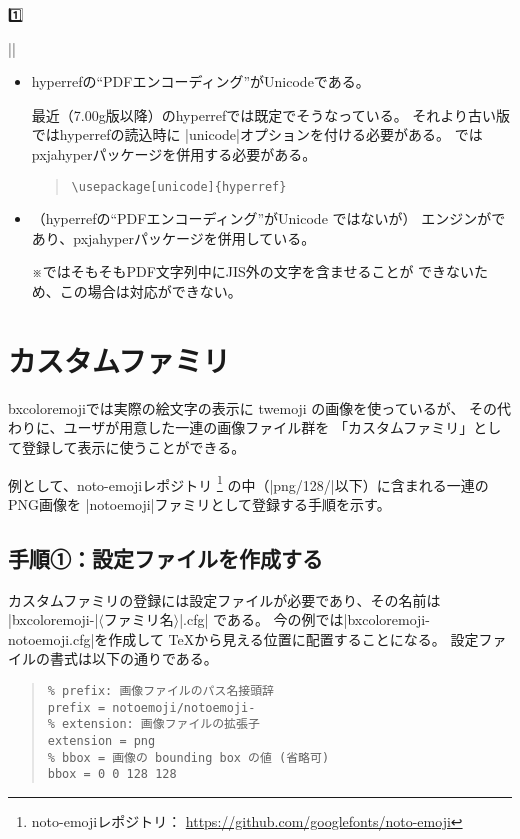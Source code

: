 \documentclass[a4paper]{ltjsarticle}
\renewcommand{\headfont}{\romanseries{sbc}\sffamily}
\newcommand{\CE}[1]{\coloremoji{#1}}
\newcommand{\Pkg}[1]{\textsf{#1}}
\newcommand{\Meta}[1]{$\langle$\mbox{}#1\mbox{}$\rangle$}
\newcommand{\Note}{\par\noindent ※}
\newcommand{\Means}{：\quad}
\newcommand{\／}{\mbox{}／\mbox{}}
\newcommand{\EG}{\eghostguarded}
\providecommand{\Strong}[1]{{\headfont#1}}
\begin{document}
\begin{coloremojiautolist}{1️⃣}
\begin{coloremojiautolist}{|\CE{♠}|}
\begin{itemize}
\item \Pkg{hyperref}の“PDFエンコーディング”がUnicodeである。

  最近（7.00g版以降）の\Pkg{hyperref}では既定でそうなっている。
  それより古い版では\Pkg{hyperref}の読込時に
  |unicode|オプションを付ける必要がある。
  \EG{(u)\pLaTeX}では\Pkg{pxjahyper}パッケージを併用する必要がある。
\begin{quote}\small\begin{verbatim}
\usepackage[unicode]{hyperref}
\end{verbatim}\end{quote}

\item （\Pkg{hyperref}の“PDFエンコーディング”がUnicode ではないが）
  エンジンが{\upLaTeX}であり、\Pkg{pxjahyper}パッケージを併用している。
  \Note {\pLaTeX}ではそもそもPDF文字列中にJIS外の文字を含ませることが
  できないため、この場合は対応ができない。
\end{itemize}


\section{カスタムファミリ}
\label{sec:Custom-Families}

\Pkg{bxcoloremoji}では実際の絵文字の表示に
twemoji の画像を使っているが、
その代わりに、ユーザが用意した一連の画像ファイル群を
「\Strong{カスタムファミリ}」として登録して表示に使うことができる。

例として、noto-emojiレポジトリ
\footnote{noto-emojiレポジトリ\Means
  \url{https://github.com/googlefonts/noto-emoji}}%
の中（|png/128/|以下）に含まれる一連のPNG画像を
|notoemoji|ファミリとして登録する手順を示す。

\subsection{手順①：設定ファイルを作成する}

カスタムファミリの登録には設定ファイルが必要であり、その名前は
|bxcoloremoji-|\Meta{ファミリ名}|.cfg|%
である。
今の例では|bxcoloremoji-notoemoji.cfg|を作成して
{\TeX}から見える位置に配置することになる。
設定ファイルの書式は以下の通りである。

\begin{quote}\small\begin{verbatim}
% prefix: 画像ファイルのパス名接頭辞
prefix = notoemoji/notoemoji-
% extension: 画像ファイルの拡張子
extension = png
% bbox = 画像の bounding box の値 (省略可)
bbox = 0 0 128 128
\end{verbatim}\end{quote}


\end{coloremojiautolist}
\end{coloremojiautolist}
\end{document}
